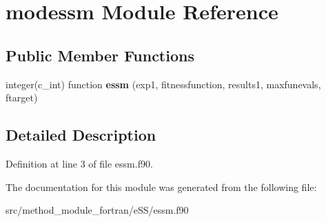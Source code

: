 \hypertarget{classmodessm}{\section{modessm Module Reference}
\label{classmodessm}
}
\subsection*{Public Member Functions}
\begin{DoxyCompactItemize}
\item 
\hypertarget{classmodessm_a7f63acc88992eb661507cd666a78e349}{integer(c\-\_\-int) function {\bfseries essm} (exp1, fitnessfunction, results1, maxfunevals, ftarget)}\label{classmodessm_a7f63acc88992eb661507cd666a78e349}

\end{DoxyCompactItemize}


\subsection{Detailed Description}


Definition at line 3 of file essm.\-f90.



The documentation for this module was generated from the following file\-:\begin{DoxyCompactItemize}
\item 
src/method\-\_\-module\-\_\-fortran/e\-S\-S/essm.\-f90\end{DoxyCompactItemize}
